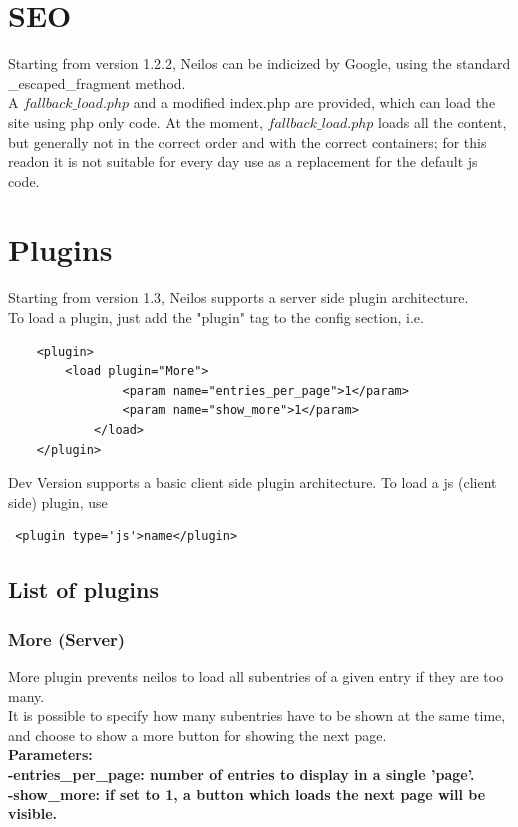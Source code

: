 \documentclass[a4paper,12pt]{article}
\begin{document}
\section{SEO}
Starting from version 1.2.2, Neilos can be indicized by Google, using the standard \_escaped\_fragment method.\\
A $fallback\_load.php$ and a modified index.php are provided, which can load the site using php only code.
At the moment, $fallback\_load.php$ loads all the content, but generally not in the correct order and with the correct containers; for this readon it is not suitable for every day use as a replacement for the default js code.

\section{Plugins}
Starting from version 1.3, Neilos supports a server side plugin architecture.\\
To load a plugin, just add the "plugin" tag to the config section, i.e.
\begin{verbatim}
    <plugin>
	    <load plugin="More">
                <param name="entries_per_page">1</param>
                <param name="show_more">1</param>
            </load>
    </plugin>
        \end{verbatim}
Dev Version supports a basic client side plugin architecture. To load a js (client side) plugin, use
\begin{verbatim}
 <plugin type='js'>name</plugin>
\end{verbatim}

\subsection{List of plugins}
\subsubsection{More (Server)}
More plugin prevents neilos to load all subentries of a given entry if they are too many.\\
It is possible to specify how many subentries have to be shown at the same time, and choose to show a more button for showing the next page.\\
\bfseries Parameters:\\
\normalfont \normalsize -entries\_per\_page: number of entries to display in a single 'page'.\\
-show\_more: if set to 1, a button which loads the next page will be visible.\\
\end{document}
